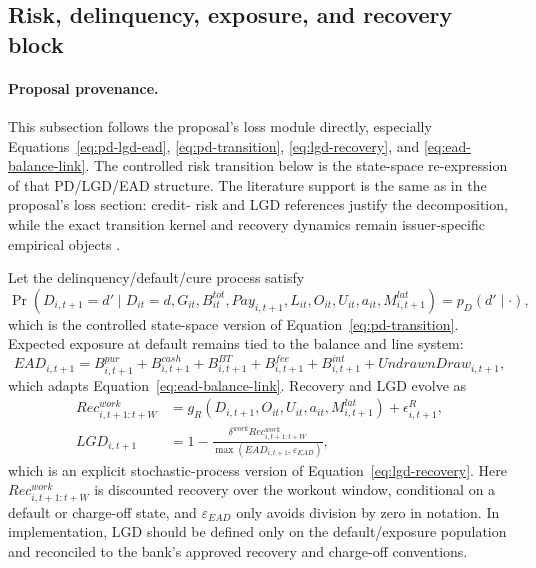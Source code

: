 \documentclass[11pt]{article}
\newcommand{\1}{\mathbf{1}}
\begin{document}
\subsection{Risk, delinquency, exposure, and recovery block}
\label{subsec:state-space-risk-block}

\paragraph{Proposal provenance.}
This subsection follows the proposal's loss module directly, especially
Equations~\eqref{eq:pd-lgd-ead}, \eqref{eq:pd-transition},
\eqref{eq:lgd-recovery}, and \eqref{eq:ead-balance-link}. The controlled risk
transition below is the state-space re-expression of that PD/LGD/EAD structure.
The literature support is the same as in the proposal's loss section: credit-
risk and LGD references justify the decomposition, while the exact transition
kernel and recovery dynamics remain issuer-specific empirical objects
\citep{hand1997credit,thomas2000survey,lessmann2015benchmarking,
schuermann2004lgd}.

Let the delinquency/default/cure process satisfy
\begin{equation}
  \Pr(D_{i,t+1}=d'\mid D_{it}=d,G_{it},B^{tot}_{it},Pay_{i,t+1},L_{it},O_{it},U_{it},a_{it},M^{lat}_{i,t+1})
  = p_D(d'\mid\cdot),
  \label{eq:ss-delinquency-transition}
\end{equation}
which is the controlled state-space version of Equation~\eqref{eq:pd-transition}.
Expected exposure at default remains tied to the balance and line system:
\begin{equation}
  EAD_{i,t+1}
  =
  B^{pur}_{i,t+1}+B^{cash}_{i,t+1}+B^{BT}_{i,t+1}+B^{fee}_{i,t+1}+B^{int}_{i,t+1}
  + UndrawnDraw_{i,t+1},
  \label{eq:ss-ead-identity}
\end{equation}
which adapts Equation~\eqref{eq:ead-balance-link}. Recovery and LGD evolve as
\begin{align}
  Rec^{work}_{i,t+1:t+W}
    &= g_R(D_{i,t+1},O_{it},U_{it},a_{it},M^{lat}_{i,t+1})
       + \epsilon^R_{i,t+1},
       \label{eq:ss-recovery-transition}\\
  LGD_{i,t+1}
    &=
    1-\frac{\delta^{work}Rec^{work}_{i,t+1:t+W}}
            {\max(EAD_{i,t+1},\varepsilon_{EAD})},
       \label{eq:ss-lgd-identity}
\end{align}
which is an explicit stochastic-process version of Equation~\eqref{eq:lgd-recovery}.
Here $Rec^{work}_{i,t+1:t+W}$ is discounted recovery over the workout window,
conditional on a default or charge-off state, and $\varepsilon_{EAD}$ only avoids
division by zero in notation. In implementation, LGD should be defined only on
the default/exposure population and reconciled to the bank's approved recovery
and charge-off conventions.
\end{document}
